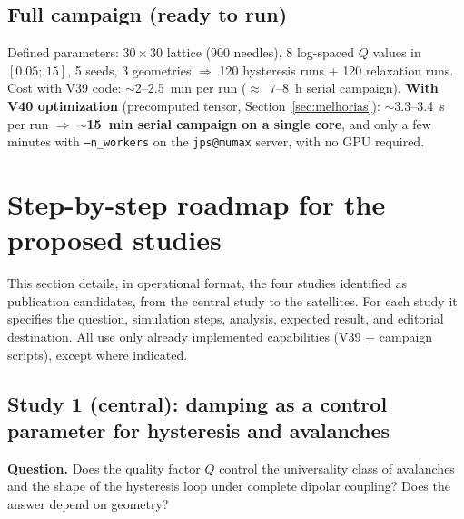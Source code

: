 \documentclass[11pt,a4paper]{article}
\newcommand{\code}[1]{\texttt{#1}}
\begin{document}
\subsection{Full campaign (ready to run)}

Defined parameters: $30\times30$ lattice (900 needles), 8 log-spaced $Q$ values in $[0.05;\,15]$, 5 seeds, 3 geometries $\Rightarrow$ 120 hysteresis runs + 120 relaxation runs. Cost with V39 code: $\sim$2--2.5~min per run ($\approx$~7--8~h serial campaign). \textbf{With V40 optimization} (precomputed tensor, Section~\ref{sec:melhorias}): $\sim$3.3--3.4~s per run $\Rightarrow$ \textbf{$\sim$15~min serial campaign on a single core}, and only a few minutes with \code{--n\_workers} on the \code{jps@mumax} server, with no GPU required.

\section{Step-by-step roadmap for the proposed studies}
\label{sec:roteiro}

This section details, in operational format, the four studies identified as publication candidates, from the central study to the satellites. For each study it specifies the question, simulation steps, analysis, expected result, and editorial destination. All use only already implemented capabilities (V39 + campaign scripts), except where indicated.

\subsection{Study 1 (central): damping as a control parameter for hysteresis and avalanches}

\textbf{Question.} Does the quality factor $Q$ control the universality class of avalanches and the shape of the hysteresis loop under complete dipolar coupling? Does the answer depend on geometry?
\end{document}
